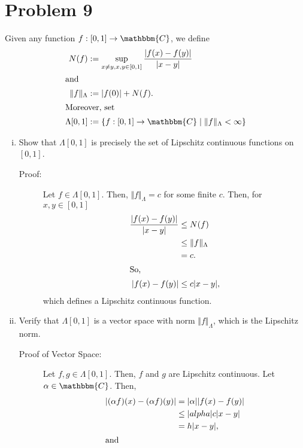 \documentclass[10pt]{extarticle}
\begin{document}
  \section{Problem 9}%
  Given any function $f: [0,1]\rightarrow \mathbbm{C}$, we define
  \begin{align*}
    N(f) &:= \sup_{x\neq y, x,y\in[0,1]}\frac{|f(x)-f(y)|}{|x-y|}\\
    \shortintertext{and}
    \Vert f\Vert_{\Lambda} &:= |f(0)| + N(f).\\
    \shortintertext{Moreover, set}
    \Lambda[0,1] &:= \left\{f: [0,1]\rightarrow \mathbbm{C}\mid \Vert f\Vert_{\Lambda} < \infty\right\}
  \end{align*}
  \begin{enumerate}[(i)]
    \item Show that $\Lambda[0,1]$ is precisely the set of Lipschitz continuous functions on $[0,1]$.
      \begin{description}
        \item[Proof:] Let $f\in \Lambda[0,1]$. Then, $\Vert f\Vert_{\Lambda} = c$ for some finite $c$. Then, for $x,y\in [0,1]$
          \begin{align*}
            \frac{|f(x)-f(y)|}{|x-y|}&\leq N(f)\\
                                     &\leq \Vert f\Vert_{\Lambda}\\
                                     &= c.\\
                                     \shortintertext{So,}
            |f(x)-f(y)| &\leq c|x-y|,
          \end{align*}
          which defines a Lipschitz continuous function.
      \end{description}
    \item Verify that $\Lambda[0,1]$ is a vector space with norm $\Vert f\Vert_{\Lambda}$, which is the Lipschitz norm.
      \begin{description}
        \item[Proof of Vector Space:] Let $f,g\in \Lambda[0,1]$. Then, $f$ and $g$ are Lipschitz continuous. Let $\alpha\in \mathbbm{C}$. Then,
          \begin{align*}
            |(\alpha f)(x) - (\alpha f)(y)| &= |\alpha||f(x)-f(y)|\\
                                            &\leq |alpha|c|x-y|\\
                                            &= h|x-y|,\\
                                            \shortintertext{and}

\end{align*}
\end{description}
\end{enumerate}
\end{document}
